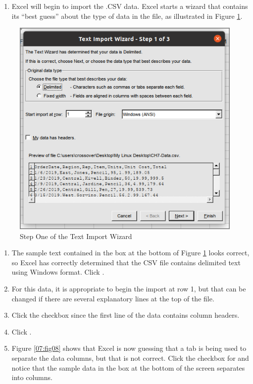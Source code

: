 \begin{enumerate}
	\item Excel will begin to import the .CSV data. Excel starts a wizard that contains its ``best guess'' about the type of data in the file, as illustrated in Figure \ref{07:fig07}.
\end{enumerate}

\begin{figure}[H]
	\centering
	\includegraphics[width=\maxwidth{.95\linewidth}]{gfx/ch07_fig07}
	\caption{Step One of the Text Import Wizard}
	\label{07:fig07}
\end{figure}

\begin{enumerate}
	\item The sample text contained in the box at the bottom of Figure \ref{07:fig07} looks correct, so Excel has correctly determined that the CSV file contains delimited text using Windows format. Click .
	\item For this data, it is appropriate to begin the import at row 1, but that can be changed if there are several explanatory lines at the top of the file.
	\item Click the  checkbox since the first line of the data contains column headers.
	\item Click .
	\item Figure \ref{07:fig08} shows that Excel is now guessing that a tab is being used to separate the data columns, but that is not correct. Click the checkbox for  and notice that the sample data in the box at the bottom of the screen separates into columns.
\end{enumerate}

